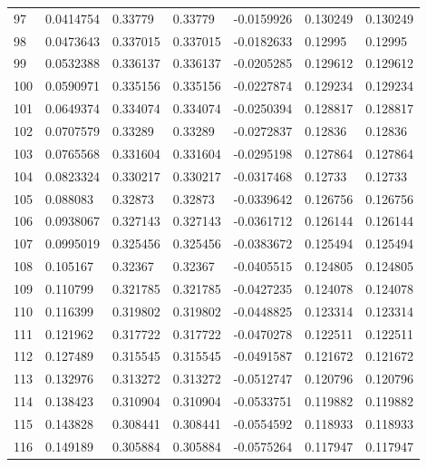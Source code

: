 \begin{longtable}{l|lll|lll}
  97 &  0.0414754   & 0.33779     & 0.33779     & -0.0159926   & 0.130249    & 0.130249    \\
  98 &  0.0473643   & 0.337015    & 0.337015    & -0.0182633   & 0.12995     & 0.12995     \\
  99 &  0.0532388   & 0.336137    & 0.336137    & -0.0205285   & 0.129612    & 0.129612    \\
 100 &  0.0590971   & 0.335156    & 0.335156    & -0.0227874   & 0.129234    & 0.129234    \\
 101 &  0.0649374   & 0.334074    & 0.334074    & -0.0250394   & 0.128817    & 0.128817    \\
 102 &  0.0707579   & 0.33289     & 0.33289     & -0.0272837   & 0.12836     & 0.12836     \\
 103 &  0.0765568   & 0.331604    & 0.331604    & -0.0295198   & 0.127864    & 0.127864    \\
 104 &  0.0823324   & 0.330217    & 0.330217    & -0.0317468   & 0.12733     & 0.12733     \\
 105 &  0.088083    & 0.32873     & 0.32873     & -0.0339642   & 0.126756    & 0.126756    \\
 106 &  0.0938067   & 0.327143    & 0.327143    & -0.0361712   & 0.126144    & 0.126144    \\
 107 &  0.0995019   & 0.325456    & 0.325456    & -0.0383672   & 0.125494    & 0.125494    \\
 108 &  0.105167    & 0.32367     & 0.32367     & -0.0405515   & 0.124805    & 0.124805    \\
 109 &  0.110799    & 0.321785    & 0.321785    & -0.0427235   & 0.124078    & 0.124078    \\
 110 &  0.116399    & 0.319802    & 0.319802    & -0.0448825   & 0.123314    & 0.123314    \\
 111 &  0.121962    & 0.317722    & 0.317722    & -0.0470278   & 0.122511    & 0.122511    \\
 112 &  0.127489    & 0.315545    & 0.315545    & -0.0491587   & 0.121672    & 0.121672    \\
 113 &  0.132976    & 0.313272    & 0.313272    & -0.0512747   & 0.120796    & 0.120796    \\
 114 &  0.138423    & 0.310904    & 0.310904    & -0.0533751   & 0.119882    & 0.119882    \\
 115 &  0.143828    & 0.308441    & 0.308441    & -0.0554592   & 0.118933    & 0.118933    \\
 116 &  0.149189    & 0.305884    & 0.305884    & -0.0575264   & 0.117947    & 0.117947    \\

\end{longtable}
